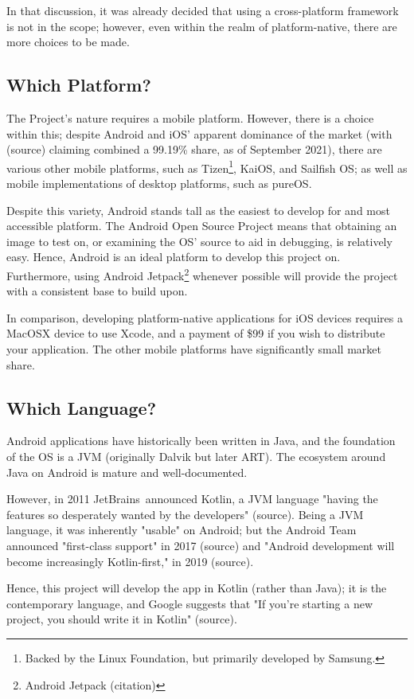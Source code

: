\documentclass[11pt, a4paper, notitlepage]{report}
\begin{document}
In that discussion, it was already decided that using a cross-platform 
framework is not in the scope; however, even within the realm of 
platform-native, there are more choices to be made.

\subsection{Which Platform?}
The Project's nature requires a mobile platform. However, there is a choice 
within this; despite Android and iOS' apparent dominance of the market (with 
(source) claiming combined a 99.19\% share, as of September 2021), there 
are various other mobile platforms, such as Tizen\footnote{Backed by the Linux 
Foundation, but primarily developed by Samsung.}, KaiOS, and Sailfish OS; as 
well as mobile implementations of desktop platforms, such as pureOS.

Despite this variety, Android stands tall as the easiest to develop for and 
most accessible platform. The Android Open Source Project means that obtaining 
an image to test on, or examining the OS' source to aid in debugging, is 
relatively easy. Hence, Android is an ideal platform to develop this project 
on. Furthermore, using Android Jetpack\footnote{Android Jetpack (citation)} 
whenever possible will provide the project with a consistent base to build upon.

In comparison, developing platform-native applications for iOS devices requires 
a MacOSX device to use Xcode, and a payment of \$99 if you wish to distribute 
your application. The other mobile platforms have significantly small market 
share.

\subsection{Which Language?}
Android applications have historically been written in Java, and the foundation 
of the OS is a JVM (originally Dalvik but later ART). The ecosystem around Java 
on Android is mature and well-documented.

However, in 2011 JetBrains\texttrademark\ announced Kotlin, a JVM language 
"having the features so desperately wanted by the developers" (source). Being a 
JVM language, it was inherently "usable" on Android; but the Android Team 
announced "first-class support" in 2017 (source) and "Android development will 
become increasingly Kotlin-first," in 2019 (source).

Hence, this project will develop the app in Kotlin (rather than Java); it is 
the contemporary language, and Google suggests that "If you’re starting a new 
project, you should write it in Kotlin" (source).
\end{document}
